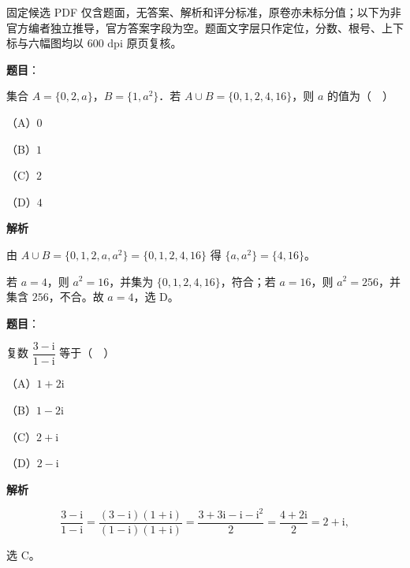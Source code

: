 

\begin{gktip}
固定候选 PDF 仅含题面，无答案、解析和评分标准，原卷亦未标分值；以下为非官方编者独立推导，官方答案字段为空。题面文字层只作定位，分数、根号、上下标与六幅图均以 600 dpi 原页复核。
\end{gktip}

\begin{answer}

\textbf{题目}：

集合 $A=\{0,2,a\}$，$B=\{1,a^2\}$．若 $A\cup B=\{0,1,2,4,16\}$，则 $a$ 的值为（　）

（A）$0$

（B）$1$

（C）$2$

（D）$4$

\textbf{解析}

由 $A\cup B=\{0,1,2,a,a^2\}=\{0,1,2,4,16\}$ 得 $\{a,a^2\}=\{4,16\}$。

若 $a=4$，则 $a^2=16$，并集为 $\{0,1,2,4,16\}$，符合；若 $a=16$，则 $a^2=256$，并集含 $256$，不合。故 $a=4$，选 D。


\end{answer}
\begin{answer}

\textbf{题目}：

复数 $\dfrac{3-\mathrm i}{1-\mathrm i}$ 等于（　）

（A）$1+2\mathrm i$

（B）$1-2\mathrm i$

（C）$2+\mathrm i$

（D）$2-\mathrm i$

\textbf{解析}

\nopagebreak[4]
\[\frac{3-\mathrm i}{1-\mathrm i}
=\frac{(3-\mathrm i)(1+\mathrm i)}{(1-\mathrm i)(1+\mathrm i)}
=\frac{3+3\mathrm i-\mathrm i-\mathrm i^2}{2}
=\frac{4+2\mathrm i}{2}=2+\mathrm i,\]

选 C。


\end{answer}
